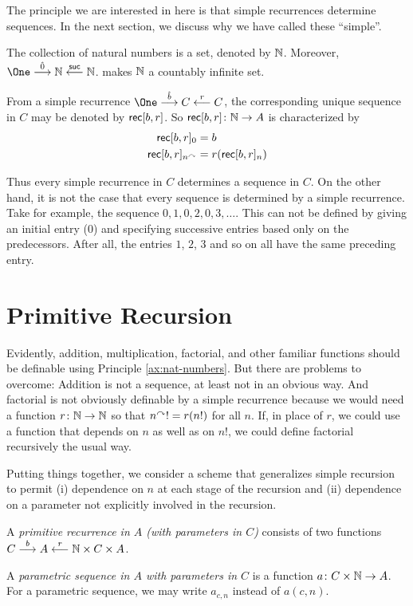The principle we are interested in here is that simple recurrences determine sequences. In the next section, we discuss why we have called these ``simple''.

\begin{principle}\label{ax:nat-numbers}
	The collection of natural numbers is a set, denoted by $\mathbb N$.
	Moreover, $\One \stackrel{\hat{0}}{\longrightarrow} \NN \stackrel{\suc}{\longleftarrow} \NN$.
	makes $\mathbb N$ a countably infinite set.
	
	From a simple recurrence $\One \stackrel{\hat{b}}{\longrightarrow} C \stackrel{r}{\longleftarrow} C$, the corresponding unique sequence in $C$
	may be denoted by $\mathord{\textsf{rec}}[b,r]$. So ${\mathord{\textsf{rec}}[b,r]}\colon{\mathbb N}\to{A}$ is characterized by
	\begin{align*}
		\mathord{\textsf{rec}}[b,r]_0 &= b\\
		\mathord{\textsf{rec}}[b,r]_{n^\curvearrowright} &= r(\mathord{\textsf{rec}}[b,r]_n)
	\end{align*}
\end{principle}

Thus every simple recurrence in $C$ determines a sequence in $C$. 
On the other hand, it is not the case that every sequence is determined by a simple recurrence.
Take for example, the sequence $0,1,0,2,0,3,\ldots$. 
This can not be defined by giving an initial entry ($0$) and specifying successive entries based only on the predecessors. 
After all, the entries $1$, $2$, $3$ and so on all have the same preceding entry.

\section{Primitive Recursion}

Evidently, addition, multiplication, factorial, and other familiar functions should be definable using Principle \ref{ax:nat-numbers}. 
But there are problems to overcome: Addition is not a sequence, at least not in an obvious way. And factorial is not obviously definable by a simple recurrence
because we would need a function ${r}\colon{\mathbb N}\to{\mathbb N}$ so that $n^\curvearrowright! = r(n!)$
for all $n$. If, in place of $r$, we could use a function that depends on $n$ as well as on $n!$, we could define factorial recursively the usual way.

Putting things together, we consider a scheme that generalizes simple recursion to permit (i) dependence on $n$ at each stage of the recursion and (ii) dependence on a parameter not explicitly involved in the recursion.

\begin{defn}
	A \emph{primitive recurrence in $A$ (with parameters in $C$)} consists of two  functions $C\stackrel{b}{\longrightarrow} A\stackrel{r}{\longleftarrow}\mathbb N\times C\times A$.
	
	A \emph{parametric sequence in $A$ with parameters in $C$} is a function
	${a}\colon{C\times \mathbb N}\to{A}$. For a parametric sequence, we may write $a_{c,n}$
	instead of $a(c,n)$. 
\end{defn}

